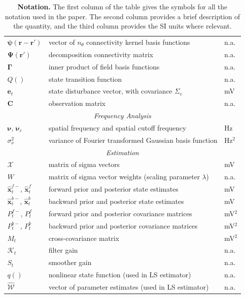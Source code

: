 \documentclass[5p,authoryear]{elsarticle}
\begin{document}
\begin{table}[!ht]
\begin{tabular}{|l|l|l|}
   	$\boldsymbol{\psi}(\mathbf{r}-\mathbf{r}')$ & vector of $n_{\theta}$ connectivity kernel basis functions & n.a.\\
   	$\boldsymbol{\Psi}(\mathbf{r}')$ & decomposition connectivity matrix & n.a.\\
   	$\boldsymbol{\Gamma}$ & inner product of field basis functions & n.a.\\
   	$Q()$ & state transition function & n.a.\\
   	$\mathbf{e}_t$ & state disturbance vector, with covariance $\Sigma_e$ & mV\\
   	$\mathbf{C}$ & observation matrix & n.a. \\
	\hline
	\multicolumn{3}{|c|}{\emph{Frequency Analysis}} \\
	\hline
	$\boldsymbol{\nu}$, $\boldsymbol{\nu}_c$ & spatial frequency and spatial cutoff frequency & Hz \\
	$\sigma_{\nu}^2$ & variance of Fourier transformed Gaussian basis function & Hz$^2$\\
	\hline
	\multicolumn{3}{|c|}{\emph{Estimation}} \\
	\hline
	$\mathcal{X}$ & matrix of sigma vectors & mV\\
	$W$ & matrix of sigma vector weights (scaling parameter $\lambda$) & n.a.\\
   	$\hat{\mathbf{x}}_t^{f-}$, $\hat{\mathbf{x}}_t^f$ & forward prior and posterior state estimates & mV\\
   	$\hat{\mathbf{x}}_t^{b-}$, $\hat{\mathbf{x}}_t^{b}$ & backward prior and posterior state estimates & mV\\
 	$P^{f-}_t$, $P^f_t$  & forward prior and posterior covariance matrices & mV$^2$\\
   	$P^{b-}_t$, $P^b_t$ & backward prior and posterior covariance matrices & mV$^2$\\
	$M_t$& cross-covariance matrix & mV$^2$\\
	$\mathcal K_{t} $ & filter gain & n.a.\\
	$S_t$ & smoother gain & n.a.\\
	$q()$ & nonlinear state function (used in LS estimator) & n.a.\\
   	$\mathcal{\hat{W}}$& vector of parameter estimates (used in LS estimator) & n.a.\\	
	\hline
\end{tabular}
\caption{\textbf{Notation.} The first column of the table gives the symbols for all the notation used in the paper. The second column provides a brief description of the quantity, and the third column provides the SI units where relevant.}
\label{tab:Notation}
\end{table}
\end{document}
